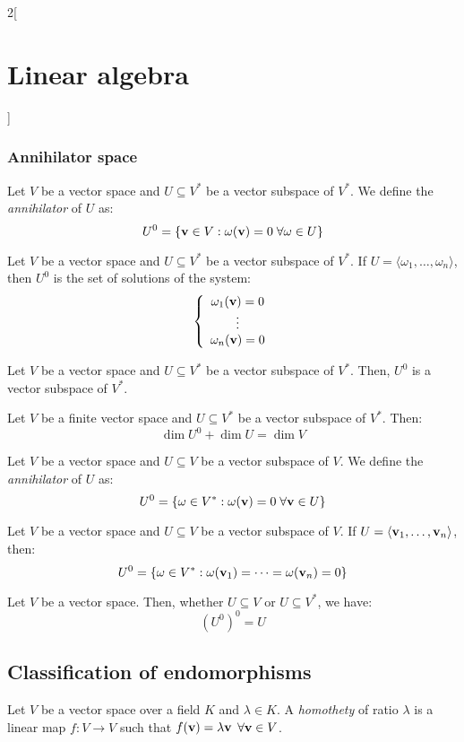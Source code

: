\documentclass[../../../main.tex]{subfiles}
\begin{document}
\begin{multicols}{2}[\section{Linear algebra}]
  \subsubsection{Annihilator space}
  \begin{definition}
    Let $V$ be a vector space and $U\subseteq V^*$ be a vector subspace of $V^*$. We define the \emph{annihilator} of $U$ as:
    $$U^0=\{\boldsymbol{\mathrm{v}}\in V:\omega(\boldsymbol{\mathrm{v}})=0\;\forall\omega\in U\}$$
  \end{definition}
  \begin{lemma}
    Let $V$ be a vector space and $U\subseteq V^*$ be a vector subspace of $V^*$. If $U=\langle\omega_1,\ldots,\omega_n\rangle$, then $U^0$ is the set of solutions of the system:
    $$\left\{
      \begin{array}{c}
        \omega_1(\boldsymbol{\mathrm{v}})=0 \\
        \vdots                         \\
        \omega_n(\boldsymbol{\mathrm{v}})=0
      \end{array}
      \right.$$
  \end{lemma}
  \begin{lemma}
    Let $V$ be a vector space and $U\subseteq V^*$ be a vector subspace of $V^*$. Then, $U^0$ is a vector subspace of $V^*$.
  \end{lemma}
  \begin{theorem}
    Let $V$ be a finite vector space and $U\subseteq V^*$ be a vector subspace of $V^*$. Then: $$\dim U^0+\dim U=\dim V$$
  \end{theorem}
  \begin{definition}
    Let $V$ be a vector space and $U\subseteq V$ be a vector subspace of $V$. We define the \emph{annihilator} of $U$ as:
    $$U^0=\{\omega\in V^*:\omega(\boldsymbol{\mathrm{v}})=0\;\forall\boldsymbol{\mathrm{v}}\in U\}$$
  \end{definition}
  \begin{lemma}
    Let $V$ be a vector space and $U\subseteq V$  be a vector subspace of $V$. If $U=\langle\boldsymbol{\mathrm{v}}_1,\ldots,\boldsymbol{\mathrm{v}}_n\rangle$, then: $$U^0=\{\omega\in V^*:\omega(\boldsymbol{\mathrm{v}}_1)=\cdots=\omega(\boldsymbol{\mathrm{v}}_n)=0\}$$
  \end{lemma}
  \begin{prop}
    Let $V$ be a vector space. Then, whether $U\subseteq V$ or $U\subseteq V^*$, we have: $${(U^0)}^0=U$$
  \end{prop}
  \subsection{Classification of endomorphisms}
  \begin{definition}
    Let $V$ be a vector space over a field $K$ and $\lambda\in K$. A \emph{homothety} of ratio $\lambda$ is a linear map $f:V\rightarrow V$ such that $f(\boldsymbol{\mathrm{v}})=\lambda\boldsymbol{\mathrm{v}}$ $\forall\boldsymbol{\mathrm{v}}\in V$.
  \end{definition}

\end{multicols}
\end{document}
